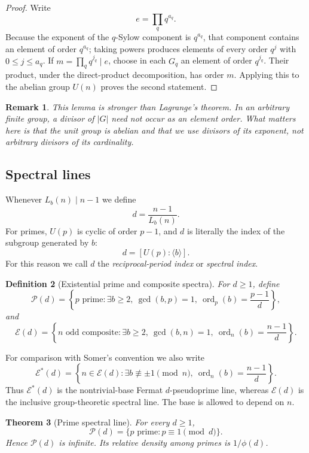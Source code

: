 \documentclass[11pt]{article}
\newtheorem{theorem}{Theorem}[section]
\newtheorem{definition}[theorem]{Definition}
\newtheorem{remark}[theorem]{Remark}
\newcommand{\ord}{\operatorname{ord}}
\newcommand{\Eset}{\mathcal E}
\newcommand{\Pset}{\mathcal P}
\begin{document}
\begin{proof}
Write
\[
e=\prod_q q^{a_q}.
\]
Because the exponent of the $q$-Sylow component is $q^{a_q}$, that component
contains an element of order $q^{a_q}$; taking powers produces elements of
every order $q^j$ with $0\le j\le a_q$.  If
$m=\prod_q q^{j_q}\mid e$, choose in each $G_q$ an element of order
$q^{j_q}$.  Their product, under the direct-product decomposition, has order
$m$.  Applying this to the abelian group $U(n)$ proves the second statement.
\end{proof}

\begin{remark}
This lemma is stronger than Lagrange's theorem.  In an arbitrary finite group,
a divisor of $|G|$ need not occur as an element order.  What matters here is
that the unit group is abelian and that we use divisors of its exponent, not
arbitrary divisors of its cardinality.
\end{remark}

\subsection{Spectral lines}

Whenever $L_b(n)\mid n-1$ we define
\[
d=\frac{n-1}{L_b(n)}.
\]
For primes, $U(p)$ is cyclic of order $p-1$, and $d$ is literally the index
of the subgroup generated by $b$:
\[
d=[U(p):\langle b\rangle].
\]
For this reason we call $d$ the \emph{reciprocal-period index} or
\emph{spectral index}.

\begin{definition}[Existential prime and composite spectra]
For $d\ge1$, define
\[
\Pset(d)
=
\left\{
p\text{ prime}:
\exists b\ge2,\ \gcd(b,p)=1,\
\ord_p(b)=\frac{p-1}{d}
\right\},
\]
and
\[
\Eset(d)
=
\left\{
n\text{ odd composite}:
\exists b\ge2,\ \gcd(b,n)=1,\
\ord_n(b)=\frac{n-1}{d}
\right\}.
\]
\end{definition}

For comparison with Somer's convention we also write
\[
\Eset^\ast(d)
=
\left\{
n\in\Eset(d):
\exists b\not\equiv\pm1\pmod n,\
\ord_n(b)=\frac{n-1}{d}
\right\}.
\]
Thus $\Eset^\ast(d)$ is the nontrivial-base Fermat $d$-pseudoprime line,
whereas $\Eset(d)$ is the inclusive group-theoretic spectral line.  The base
is allowed to depend on $n$.

\begin{theorem}[Prime spectral line]
\label{thm:prime-spectrum}
For every $d\ge1$,
\[
\Pset(d)=\{p\text{ prime}:p\equiv1\pmod d\}.
\]
Hence $\Pset(d)$ is infinite.  Its relative density among primes is
$1/\phi(d)$.
\end{theorem}
\end{document}
